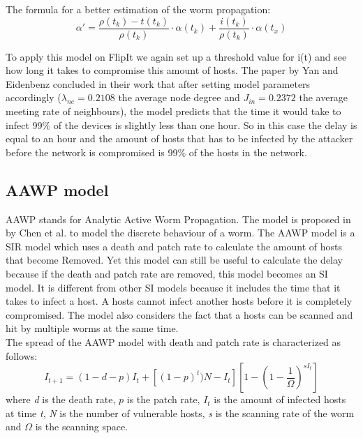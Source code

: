 The formula for a better estimation of the worm propagation:
\begin{equation}
\alpha'=\dfrac{\rho(t_{k})-t(t_{k})}{\rho(t_{k})} \cdot \alpha(t_{k}) + \dfrac{i(t_{k})}{\rho(t_{k})} \cdot \alpha(t_{x})
\end{equation}

To apply this model on FlipIt we again set up a threshold value for i(t) and see how long it takes to compromise this amount of hosts.  The paper by Yan and Eidenbenz concluded in their work  that after setting model parameters accordingly ($\lambda_{ne} = 0.2108$ the average node degree and $J_{in}= 0.2372$ the average meeting rate of neighbours), the model predicts that the time it would take to infect 99$\%$ of the devices is slightly less than one hour. So in this case the delay is equal to an hour and the amount of hosts that has to be infected by the attacker before the network is compromised is 99$\%$ of the hosts in the network.


\subsection{AAWP model}
AAWP stands for Analytic Active Worm Propagation. The model is proposed in \cite{chen2003modeling} by Chen et al. to model the discrete behaviour of a worm. The AAWP model is a SIR model which uses a death and patch rate to calculate the amount of hosts that become Removed. Yet this model can still be useful to calculate the delay because if the death and patch rate are removed, this model becomes an SI model. It is different from other SI models because it includes the time that it takes to infect a host. A hosts cannot infect another hosts before it is completely compromised. The model also considers the fact that a hosts can be scanned and hit by multiple worms at the same time. \\%

The spread of the AAWP model with death and patch rate is characterized as follows:
\begin{equation}
I_{t+1}=(1-d-p)I_{t}+[(1-p)^{t})N-I_{t}][1-(1-\dfrac{1}{\Omega})^{sI_{t}}]
\end{equation}
where \textit{d} is the death rate, $p$ is the patch rate, $I_{t}$ is the amount of infected hosts at time \textit{t}, \textit{N} is the number of vulnerable hosts, \textit{s} is
the scanning rate of the worm and $\Omega$ is the scanning
space. \\


